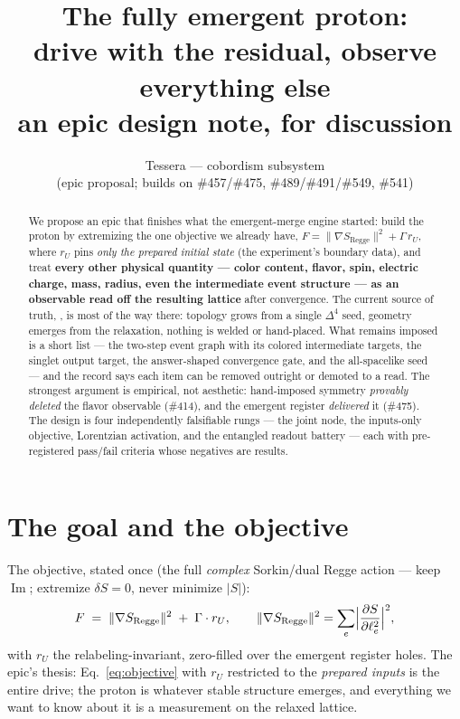 \documentclass[11pt]{article}
\title{\bfseries The fully emergent proton:\\
drive with the residual, observe everything else\\
\large an epic design note, for discussion}
\author{Tessera --- cobordism subsystem\\
(epic proposal; builds on \#457/\#475, \#489/\#491/\#549, \#541)}
\date{}
\newcommand{\abs}[1]{\lvert #1 \rvert}
\newcommand{\norm}[1]{\lVert #1 \rVert}
\newcommand{\rU}{r_{U}}
\newcommand{\gradS}{\norm{\nabla S_{\mathrm{Regge}}}^2}
\begin{document}
\maketitle

\begin{abstract}
\noindent We propose an epic that finishes what the emergent-merge engine started: build the
proton by extremizing the one objective we already have,
$F = \gradS + \Gamma\,\rU$, where $\rU$ pins \emph{only the prepared initial state}
(the experiment's boundary data), and treat \textbf{every other physical quantity ---
color content, flavor, spin, electric charge, mass, radius, even the intermediate event
structure --- as an observable read off the resulting lattice} after convergence. The
current source of truth, , is most of the way there: topology grows
from a single $\Delta^4$ seed, geometry emerges from the relaxation, nothing is welded or
hand-placed. What remains imposed is a short list --- the two-step event graph with its
colored intermediate targets, the singlet output target, the answer-shaped convergence
gate, and the all-spacelike seed --- and the record says each item can be removed outright
or demoted to a read. The strongest argument is empirical, not aesthetic: hand-imposed
symmetry \emph{provably deleted} the flavor observable (\#414), and the emergent register
\emph{delivered} it (\#475). The design is four independently falsifiable rungs --- the
joint node, the inputs-only objective, Lorentzian activation, and the entangled readout
battery --- each with pre-registered pass/fail criteria whose negatives are results.
\end{abstract}

\section{The goal and the objective}

The objective, stated once (the full \emph{complex} Sorkin/dual Regge action --- keep
$\operatorname{Im}$; extremize $\delta S = 0$, never minimize $\abs{S}$):
\begin{equation}
F \;=\; \gradS \;+\; \Gamma \cdot \rU ,
\qquad
\gradS = \sum_e \Bigl\lvert \frac{\partial S}{\partial \ell_e^2} \Bigr\rvert^2 ,
\label{eq:objective}
\end{equation}
with $\rU$ the relabeling-invariant, zero-filled  over the
emergent register holes. The epic's thesis: Eq.~\eqref{eq:objective} with $\rU$ restricted
to the \emph{prepared inputs} is the entire drive; the proton is whatever stable structure
emerges, and everything we want to know about it is a measurement on the relaxed lattice.
\end{document}
